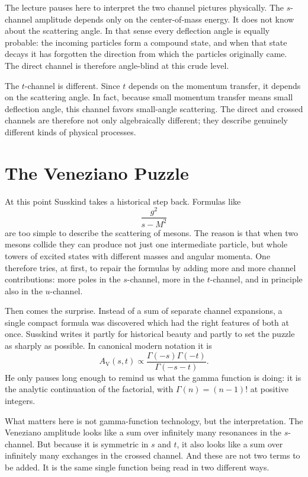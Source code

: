 The lecture pauses here to interpret the two channel pictures physically. The \(s\)-channel amplitude depends only on the center-of-mass energy. It does not know about the scattering angle. In that sense every deflection angle is equally probable: the incoming particles form a compound state, and when that state decays it has forgotten the direction from which the particles originally came. The direct channel is therefore angle-blind at this crude level.

The \(t\)-channel is different. Since \(t\) depends on the momentum transfer, it depends on the scattering angle. In fact, because small momentum transfer means small deflection angle, this channel favors small-angle scattering. The direct and crossed channels are therefore not only algebraically different; they describe genuinely different kinds of physical processes.

\section{The Veneziano Puzzle}

At this point Susskind takes a historical step back. Formulas like
\begin{equation}
\frac{g^2}{s-M^2}
\end{equation}
are too simple to describe the scattering of mesons. The reason is that when two mesons collide they can produce not just one intermediate particle, but whole towers of excited states with different masses and angular momenta. One therefore tries, at first, to repair the formulas by adding more and more channel contributions: more poles in the \(s\)-channel, more in the \(t\)-channel, and in principle also in the \(u\)-channel.

Then comes the surprise. Instead of a sum of separate channel expansions, a single compact formula was discovered which had the right features of both at once. Susskind writes it partly for historical beauty and partly to set the puzzle as sharply as possible. In canonical modern notation it is
\begin{equation}
A_{\mathrm V}(s,t)\propto \frac{\Gamma(-s)\Gamma(-t)}{\Gamma(-s-t)}.
\end{equation}
He only pauses long enough to remind us what the gamma function is doing: it is the analytic continuation of the factorial, with \(\Gamma(n)=(n-1)!\) at positive integers.

What matters here is not gamma-function technology, but the interpretation. The Veneziano amplitude looks like a sum over infinitely many resonances in the \(s\)-channel. But because it is symmetric in \(s\) and \(t\), it also looks like a sum over infinitely many exchanges in the crossed channel. And these are not two terms to be added. It is the same single function being read in two different ways.

